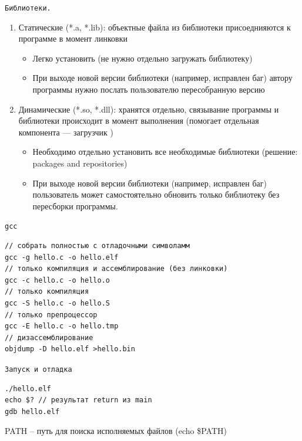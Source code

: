 \documentclass[pdf, 10pt, unicode]{beamer}
\begin{document}
\begin{frame}[fragile]{{\tt Библиотеки.}}

\begin{enumerate}
  \item Статические (*.a, *.lib): объектные файла из библиотеки присоеднияются к программе в момент линковки
    \begin{itemize}
        \item Легко установить (не нужно отдельно загружать библиотеку)
        \item При выходе новой версии библиотеки (например, исправлен баг) автору программы нужно послать пользователю пересобранную версию
    \end{itemize}
  \item Динамические (*.so, *.dll): хранятся отдельно, связывание программы и библиотеки происходит в момент выполнения (помогает отдельная компонента --- загрузчик )
    \begin{itemize}
        \item Необходимо отдельно установить все необходимые библиотеки (решение: packages and repositories)
        \item При выходе новой версии библиотеки (например, исправлен баг) пользователь может самостоятельно обновить только библиотеку без пересборки программы.
    \end{itemize}

\end{enumerate}

\end{frame}


\begin{frame}[fragile]{{\tt gcc }}
\begin{verbatim}
// собрать полностью с отладочными символамм
gcc -g hello.c -o hello.elf
// только компиляция и ассемблирование (без линковки)
gcc -c hello.c -o hello.o
// только компиляция
gcc -S hello.c -o hello.S
// только препроцессор
gcc -E hello.c -o hello.tmp
// дизассемблирование
objdump -D hello.elf >hello.bin
\end{verbatim}
\end{frame}

\begin{frame}[fragile]{{\tt Запуск и отладка }}
\begin{verbatim}
./hello.elf
echo $? // результат return из main
gdb hello.elf
\end{verbatim}
PATH -- путь для поиска исполняемых файлов (echo \$PATH)
\end{frame}
\end{document}
